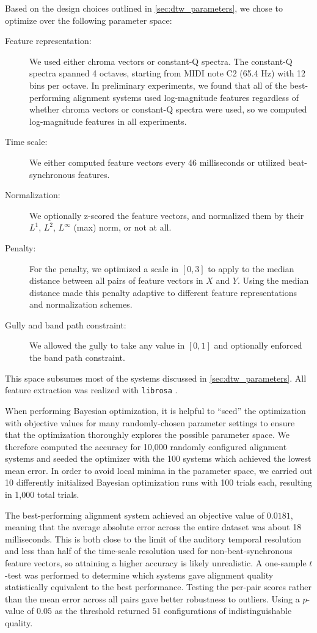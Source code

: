 Based on the design choices outlined in \cref{sec:dtw_parameters}, we chose to optimize over the following parameter space:
\begin{description}
\item[Feature representation:] We used either chroma vectors or constant-Q spectra.
The constant-Q spectra spanned 4 octaves, starting from MIDI note C2 (65.4 Hz) with 12 bins per octave.
In preliminary experiments, we found that all of the best-performing alignment systems used log-magnitude features regardless of whether chroma vectors or constant-Q spectra were used, so we computed log-magnitude features in all experiments.
\item[Time scale:] We either computed feature vectors every 46 milliseconds or utilized beat-synchronous features.
\item[Normalization:] We optionally z-scored the feature vectors, and normalized them by their $L^1$, $L^2$, $L^\infty$ (max) norm, or not at all.
\item[Penalty:] For the penalty, we optimized a scale in $[0, 3]$ to apply to the median distance between all pairs of feature vectors in $X$ and $Y$.
Using the median distance made this penalty adaptive to different feature representations and normalization schemes.
\item[Gully and band path constraint:] We allowed the gully to take any value in $[0, 1]$ and optionally enforced the band path constraint.
\end{description}
This space subsumes most of the systems discussed in \cref{sec:dtw_parameters}.
All feature extraction was realized with \texttt{librosa} \cite{mcfee2015librosa, mcfee2015librosa_scipy}.

When performing Bayesian optimization, it is helpful to ``seed'' the optimization with objective values for many randomly-chosen parameter settings to ensure that the optimization thoroughly explores the possible parameter space.
We therefore computed the accuracy for 10,000 randomly configured alignment systems and seeded the optimizer with the 100 systems which achieved the lowest mean error.
In order to avoid local minima in the parameter space, we carried out 10 differently initialized Bayesian optimization runs with 100 trials each, resulting in 1,000 total trials.

The best-performing alignment system achieved an objective value of $0.0181$, meaning that the average absolute error across the entire dataset was about 18 milliseconds.
This is both close to the limit of the auditory temporal resolution and less than half of the time-scale resolution used for non-beat-synchronous feature vectors, so attaining a higher accuracy is likely unrealistic.
A one-sample $t$-test was performed to determine which systems gave alignment quality statistically equivalent to the best performance.
Testing the per-pair scores rather than the mean error across all pairs gave better robustness to outliers.
Using a $p$-value of $0.05$ as the threshold returned 51 configurations of indistinguishable quality.

